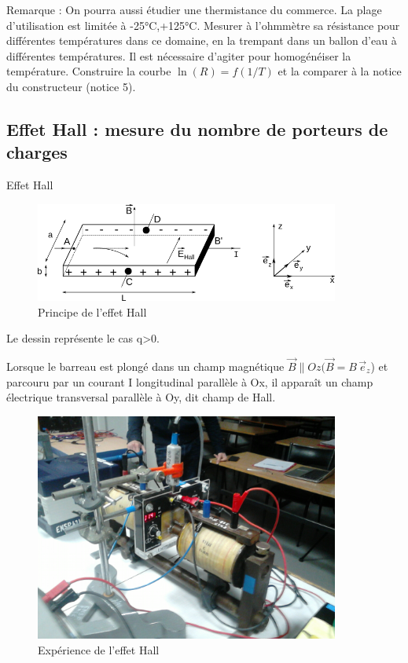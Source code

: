 \documentclass{article}%
\begin{document}
Remarque : On pourra aussi étudier une thermistance du commerce. La plage d'utilisation est limitée à -25°C,+125°C. Mesurer à l'ohmmètre sa résistance pour différentes températures dans ce domaine, en la trempant dans un ballon d'eau à différentes températures. Il est nécessaire d'agiter pour homogénéiser la température. Construire la courbe $\ln \left( R \right) = f\left( 1/T \right)$ et la comparer à la notice du constructeur (notice 5). 

\subsection{Effet Hall : mesure du nombre de porteurs de charges}

Effet Hall
\begin{figure}
	\centerline{\includegraphics[width=10cm]{images-exp/Semicon5.png}}
	\caption{Principe de l'effet Hall}
\end{figure}

Le dessin représente le cas q>0.

Lorsque le barreau est plongé dans un champ magnétique $\vec{B} \parallel Oz ( \vec{B} = B\,\vec{e}_z$) et parcouru par un courant I longitudinal parallèle à Ox, il apparaît un champ électrique transversal parallèle à Oy, dit champ de Hall.
\begin{figure}
	\centerline{\includegraphics[width=10cm]{images-exp/Hall.jpg}}
	\caption{Expérience de l'effet Hall}
\end{figure}
\end{document}
